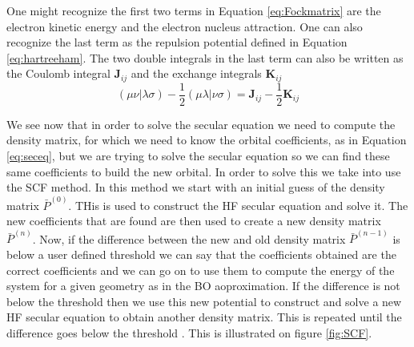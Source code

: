 \documentclass[../master_thesis.tex]{subfiles}
\begin{document}
One might recognize the first two terms in  Equation \ref{eq:Fockmatrix} are
the electron kinetic energy and the electron nucleus attraction. One can also recognize the
last term as the repulsion potential defined in Equation \ref{eq:hartreeham}.
The two double integrals in the last term can also be written as the Coulomb integral $\mathbf{J}_{ij}$
and the exchange integrals $\mathbf{K}_{ij}$ \cite{Cramer:2004}
\begin{equation}
  (\mu\nu|\lambda\sigma) - \frac{1}{2}(\mu\lambda|\nu\sigma) = \mathbf{J}_{ij} - \frac{1}{2}\mathbf{K}_{ij}
\end{equation}

We see now that in order to solve the secular equation we need to compute the
density matrix, for which we need to know the orbital coefficients, as in Equation
\ref{eq:seceq}, but we  are trying to solve the secular equation so we can find
these same coefficients to build the new orbital.
In order to solve this we take into use the \ac{SCF} method. In this method
we start with an initial guess of the density matrix $\bar{P}^{(0)}$. THis
is used to construct the \ac{HF} secular equation and solve it. The new coefficients
that are found are then used to create a new density matrix $\bar{P}^(n)$. Now, if
the difference between the new and old density matrix $ \bar{P}^(n-1)$ is below
a user defined threshold we can say that the coefficients obtained are the correct
coefficients and we can go on to use them to compute the energy of the system for
a given geometry as in the \ac{BO} aoproximation. If the difference
is not below the threshold then we use this new potential to construct and solve
a new \ac{HF} secular equation to obtain another density matrix. This is repeated
until the difference goes below the threshold \cite{Helgaker:2012, Cramer:2004}.
This is illustrated on figure \ref{fig:SCF}.
\end{document}
